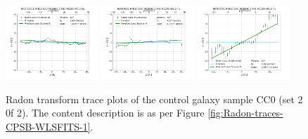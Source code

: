 \begin{figure}
    \includegraphics[width=0.31\textwidth]{Images/WLSFITS/CC0/9505-12701.png}
    \includegraphics[width=0.31\textwidth]{Images/WLSFITS/CC0/9509-9101.png}
    \includegraphics[width=0.31\textwidth]{Images/WLSFITS/CC0/9876-3701.png}
%
    \caption{Radon transform trace plots of the control galaxy sample CC0 (set 2 0f 2). The content description is as per Figure \ref{fig:Radon-traces-CPSB-WLSFITS-1}.}
    \label{fig:Radon-traces-CC0-WLSFITS-2}
\end{figure}

